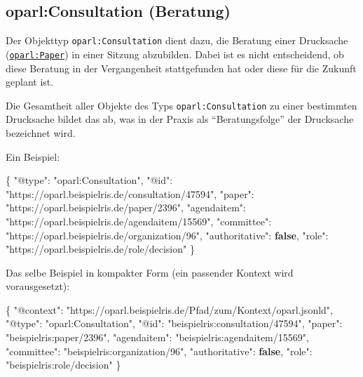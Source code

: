 \documentclass[,a4paper]{article}
\newenvironment{Shaded}{}{}
\newcommand{\KeywordTok}[1]{\textcolor[rgb]{0.00,0.44,0.13}{\textbf{{#1}}}}
\newcommand{\DataTypeTok}[1]{\textcolor[rgb]{0.56,0.13,0.00}{{#1}}}
\newcommand{\StringTok}[1]{\textcolor[rgb]{0.25,0.44,0.63}{{#1}}}
\newcommand{\FunctionTok}[1]{\textcolor[rgb]{0.02,0.16,0.49}{{#1}}}
\begin{document}
\subsection{oparl:Consultation (Beratung)}\label{oparlux5fconsultation}

Der Objekttyp \texttt{oparl:Consultation} dient dazu, die Beratung einer
Drucksache (\hyperref[oparlux5fpaper]{\texttt{oparl:Paper}}) in einer
Sitzung abzubilden. Dabei ist es nicht entscheidend, ob diese Beratung
in der Vergangenheit stattgefunden hat oder diese für die Zukunft
geplant ist.

Die Gesamtheit aller Objekte des Typs \texttt{oparl:Consultation} zu
einer bestimmten Drucksache bildet das ab, was in der Praxis als
``Beratungsfolge'' der Drucksache bezeichnet wird.

Ein Beispiel:

\begin{Shaded}
\begin{Highlighting}[]
\FunctionTok{\{}
    \DataTypeTok{"@type"}\FunctionTok{:} \StringTok{"oparl:Consultation"}\FunctionTok{,}
    \DataTypeTok{"@id"}\FunctionTok{:} \StringTok{"https://oparl.beispielris.de/consultation/47594"}\FunctionTok{,}
    \DataTypeTok{"paper"}\FunctionTok{:} \StringTok{"https://oparl.beispielris.de/paper/2396"}\FunctionTok{,}
    \DataTypeTok{"agendaitem"}\FunctionTok{:} \StringTok{"https://oparl.beispielris.de/agendaitem/15569"}\FunctionTok{,}
    \DataTypeTok{"committee"}\FunctionTok{:} \StringTok{"https://oparl.beispielris.de/organization/96"}\FunctionTok{,}
    \DataTypeTok{"authoritative"}\FunctionTok{:} \KeywordTok{false}\FunctionTok{,}
    \DataTypeTok{"role"}\FunctionTok{:} \StringTok{"https://oparl.beispielris.de/role/decision"}
\FunctionTok{\}}
\end{Highlighting}
\end{Shaded}

Das selbe Beispiel in kompakter Form (ein passender Kontext wird
vorausgesetzt):

\begin{Shaded}
\begin{Highlighting}[]
\FunctionTok{\{}
    \DataTypeTok{"@context"}\FunctionTok{:} \StringTok{"https://oparl.beispielris.de/Pfad/zum/Kontext/oparl.jsonld"}\FunctionTok{,}
    \DataTypeTok{"@type"}\FunctionTok{:} \StringTok{"oparl:Consultation"}\FunctionTok{,}
    \DataTypeTok{"@id"}\FunctionTok{:} \StringTok{"beispielris:consultation/47594"}\FunctionTok{,}
    \DataTypeTok{"paper"}\FunctionTok{:} \StringTok{"beispielris:paper/2396"}\FunctionTok{,}
    \DataTypeTok{"agendaitem"}\FunctionTok{:} \StringTok{"beispielris:agendaitem/15569"}\FunctionTok{,}
    \DataTypeTok{"committee"}\FunctionTok{:} \StringTok{"beispielris:organization/96"}\FunctionTok{,}
    \DataTypeTok{"authoritative"}\FunctionTok{:} \KeywordTok{false}\FunctionTok{,}
    \DataTypeTok{"role"}\FunctionTok{:} \StringTok{"beispielris:role/decision"}
\FunctionTok{\}}
\end{Highlighting}
\end{Shaded}
\end{document}
